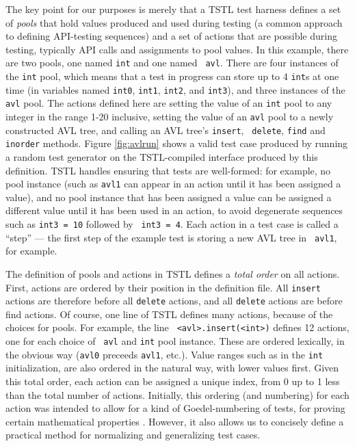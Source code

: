 The key point for our purposes is merely that a TSTL test harness
defines a set of \emph{pools} that hold values produced and used
during testing \cite{AndrewsTR} (a common approach to defining
API-testing sequences) and a set of actions that are possible during
testing, typically API calls and assignments to pool values.  In this
example, there are two pools, one named {\tt int} and one named {\tt
  avl}.  There are four instances of the {\tt int} pool, which means
that a test in progress can store up to 4 {\tt int}s at one time (in
variables named {\tt int0}, {\tt int1}, {\tt int2}, and {\tt int3}), and three
instances of the {\tt avl} pool.  The actions defined here are setting
the value of an {\tt int} pool to any integer in the range 1-20
inclusive, setting the value of an {\tt avl} pool to a newly
constructed AVL tree, and calling an AVL tree's {\tt insert}, {\tt
  delete}, {\tt find} and {\tt inorder} methods.  Figure \ref{fig:avlrun}
shows a valid test case produced by running a random test generator on
the TSTL-compiled interface produced by this definition.  TSTL handles
ensuring that tests are well-formed: for example, no pool instance
(such as {\tt avl1} can appear in an action until it has been assigned
a value), and no pool instance that has been assigned a value can be
assigned a different value until it has been used in an action, to
avoid degenerate sequences such as {\tt int3 = 10} followed by {\tt
  int3 = 4}.  Each action in a test case is called a ``step'' --- the
first step of the example test is storing a new AVL tree in {\tt
  avl1}, for example.

The definition of pools and actions in TSTL defines a \emph{total
  order} on all actions.  First, actions are ordered by their position
in the definition file.  All {\tt insert} actions are therefore before
all {\tt delete} actions, and all {\tt delete} actions are before find
actions.  Of course, one line of TSTL defines many actions, because of
the choices for pools.  For example, the line {\tt
  <avl>.insert(<int>)} defines 12 actions, one for each choice of {\tt
  avl} and {\tt int} pool instance.  These are ordered lexically, in
the obvious way ({\tt avl0} preceeds {\tt avl1}, etc.).  Value ranges
such as in the {\tt int} initialization, are also ordered in the
natural way, with lower values first.  Given this total order, each
action can be assigned a unique index, from 0 up to 1 less than the
total number of actions. Initially, this ordering (and
numbering) for each action was intended to allow for a kind of
Goedel-numbering of tests, for proving certain mathematical properties
\cite{AndrewsTR}.  However, it also allows us to concisely define a
practical method for normalizing and generalizing test cases.


